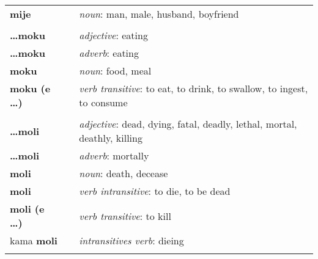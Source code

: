 \begin{supertabular}{p{2,5cm}|ll}
    \textbf{mije}                &  & \textit{noun}: man, male, husband, boyfriend                                                               \\
                                 &  &                                                                                                            \\
    \textbf{\dots moku}          &  & \textit{adjective}: eating                                                                                 \\
    \textbf{\dots moku}          &  & \textit{adverb}: eating                                                                                    \\
    \textbf{moku}                &  & \textit{noun}: food, meal                                                                                  \\
    \textbf{moku (e \dots)}      &  & \textit{verb transitive}: to eat, to drink, to swallow, to ingest, to consume                              \\
                                 &  &                                                                                                            \\
    \textbf{\dots moli}          &  & \textit{adjective}: dead, dying, fatal, deadly, lethal, mortal, deathly, killing                           \\
    \textbf{\dots moli}          &  & \textit{adverb}: mortally                                                                                  \\
    \textbf{moli}                &  & \textit{noun}: death, decease                                                                              \\
    \textbf{moli}                &  & \textit{verb intransitive}: to die, to be dead                                                             \\
    \textbf{moli (e \dots)}      &  & \textit{verb transitive}: to kill                                                                          \\
    kama \textbf{moli}           &  & \textit{intransitives verb}: dieing                                                                        \\
                                 &  &                                                                                                            \\

\end{supertabular}
